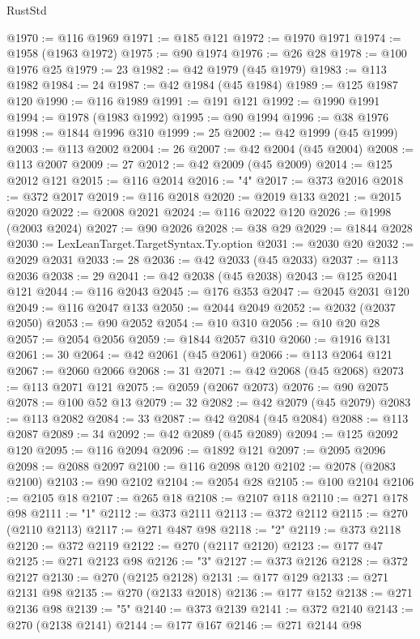 \begin{lexlean}{RustStd}
\begin{coremodule}
@1970 := @116 @1969
@1971 := @185 @121
@1972 := @1970 @1971
@1974 := @1958 (@1963 @1972)
@1975 := @90 @1974
@1976 := @26 @28
@1978 := @100 @1976 @25
@1979 := 23
@1982 := @42 @1979 (@45 @1979)
@1983 := @113 @1982
@1984 := 24
@1987 := @42 @1984 (@45 @1984)
@1989 := @125 @1987 @120
@1990 := @116 @1989
@1991 := @191 @121
@1992 := @1990 @1991
@1994 := @1978 (@1983 @1992)
@1995 := @90 @1994
@1996 := @38 @1976
@1998 := @1844 @1996 @310
@1999 := 25
@2002 := @42 @1999 (@45 @1999)
@2003 := @113 @2002
@2004 := 26
@2007 := @42 @2004 (@45 @2004)
@2008 := @113 @2007
@2009 := 27
@2012 := @42 @2009 (@45 @2009)
@2014 := @125 @2012 @121
@2015 := @116 @2014
@2016 := "4"
@2017 := @373 @2016
@2018 := @372 @2017
@2019 := @116 @2018
@2020 := @2019 @133
@2021 := @2015 @2020
@2022 := @2008 @2021
@2024 := @116 @2022 @120
@2026 := @1998 (@2003 @2024)
@2027 := @90 @2026
@2028 := @38 @29
@2029 := @1844 @2028
@2030 := LexLeanTarget.TargetSyntax.Ty.option
@2031 := @2030 @20
@2032 := @2029 @2031
@2033 := 28
@2036 := @42 @2033 (@45 @2033)
@2037 := @113 @2036
@2038 := 29
@2041 := @42 @2038 (@45 @2038)
@2043 := @125 @2041 @121
@2044 := @116 @2043
@2045 := @176 @353
@2047 := @2045 @2031 @120
@2049 := @116 @2047 @133
@2050 := @2044 @2049
@2052 := @2032 (@2037 @2050)
@2053 := @90 @2052
@2054 := @10 @310
@2056 := @10 @20 @28
@2057 := @2054 @2056
@2059 := @1844 @2057 @310
@2060 := @1916 @131
@2061 := 30
@2064 := @42 @2061 (@45 @2061)
@2066 := @113 @2064 @121
@2067 := @2060 @2066
@2068 := 31
@2071 := @42 @2068 (@45 @2068)
@2073 := @113 @2071 @121
@2075 := @2059 (@2067 @2073)
@2076 := @90 @2075
@2078 := @100 @52 @13
@2079 := 32
@2082 := @42 @2079 (@45 @2079)
@2083 := @113 @2082
@2084 := 33
@2087 := @42 @2084 (@45 @2084)
@2088 := @113 @2087
@2089 := 34
@2092 := @42 @2089 (@45 @2089)
@2094 := @125 @2092 @120
@2095 := @116 @2094
@2096 := @1892 @121
@2097 := @2095 @2096
@2098 := @2088 @2097
@2100 := @116 @2098 @120
@2102 := @2078 (@2083 @2100)
@2103 := @90 @2102
@2104 := @2054 @28
@2105 := @100 @2104
@2106 := @2105 @18
@2107 := @265 @18
@2108 := @2107 @118
@2110 := @271 @178 @98
@2111 := "1"
@2112 := @373 @2111
@2113 := @372 @2112
@2115 := @270 (@2110 @2113)
@2117 := @271 @487 @98
@2118 := "2"
@2119 := @373 @2118
@2120 := @372 @2119
@2122 := @270 (@2117 @2120)
@2123 := @177 @47
@2125 := @271 @2123 @98
@2126 := "3"
@2127 := @373 @2126
@2128 := @372 @2127
@2130 := @270 (@2125 @2128)
@2131 := @177 @129
@2133 := @271 @2131 @98
@2135 := @270 (@2133 @2018)
@2136 := @177 @152
@2138 := @271 @2136 @98
@2139 := "5"
@2140 := @373 @2139
@2141 := @372 @2140
@2143 := @270 (@2138 @2141)
@2144 := @177 @167
@2146 := @271 @2144 @98

\end{coremodule}
\end{lexlean}
